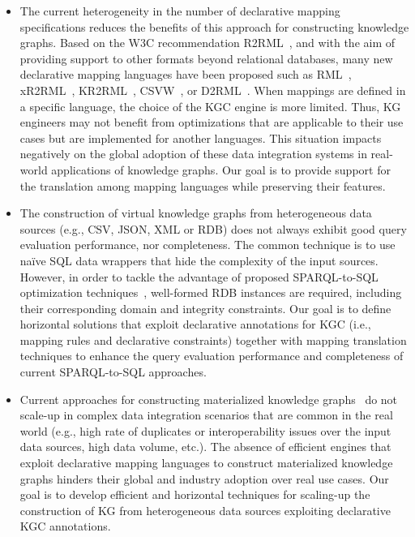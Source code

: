 \begin{itemize}
    \item The current heterogeneity in the number of declarative mapping specifications reduces the benefits of this approach for constructing knowledge graphs. Based on the W3C recommendation R2RML~\citep{R2RML}, and with the aim of providing support to other formats beyond relational databases, many new declarative mapping languages have been proposed such as RML~\citep{dimou2014rml}, xR2RML~\citep{michel2015translation}, KR2RML~\citep{slepicka2015kr2rml}, CSVW~\citep{tennison2015model}, or D2RML~\citep{chortaras2018mapping}. When mappings are defined in a specific language, the choice of the KGC engine is more limited. Thus, KG engineers may not benefit from optimizations that are applicable to their use cases but are implemented for another languages. This situation  impacts negatively on the global adoption of these data integration systems in real-world applications of knowledge graphs. Our goal is to provide support for the translation among mapping languages while preserving their features.

    \item The construction of virtual knowledge graphs from heterogeneous data sources (e.g., CSV, JSON, XML or RDB) does not always exhibit good query evaluation performance, nor completeness. The common technique is to use na\"ive SQL data wrappers that hide the complexity of the input sources. However, in order to tackle the advantage of proposed SPARQL-to-SQL optimization techniques~\citep{priyatna2014formalisation,calvanese2017ontop}, well-formed RDB instances are required, including their corresponding domain and integrity constraints. Our goal is to define horizontal solutions that exploit declarative annotations for KGC (i.e., mapping rules and declarative constraints) together with mapping translation techniques to enhance the query evaluation performance and completeness of current SPARQL-to-SQL approaches.

    \item Current approaches for constructing materialized knowledge graphs~\citep{csimcsek2019rocketrml,lefranccois2017sparql} do not scale-up in complex data integration scenarios that are common in the real world (e.g., high rate of duplicates or interoperability issues over the input data sources, high data volume, etc.). The absence of efficient engines that exploit declarative mapping languages to construct materialized knowledge graphs hinders their global and industry adoption over real use cases. Our goal is to develop efficient and horizontal techniques for scaling-up the construction of KG from heterogeneous data sources exploiting declarative KGC annotations.
\end{itemize}

